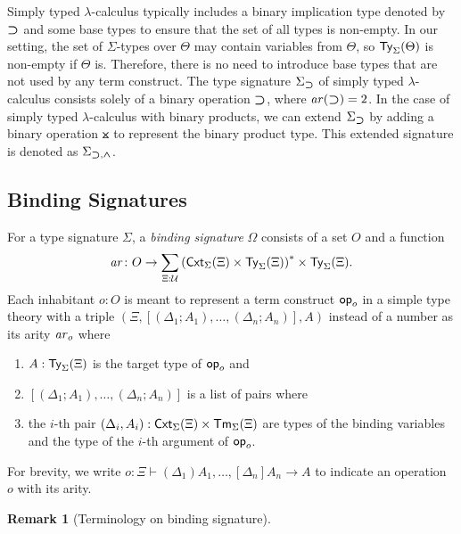 \documentclass[acmsmall,screen]{acmart}
\theoremstyle{acmdefinition}
\newtheorem{remark}[theorem]{Remark}}
\begin{document}
\begin{example}\label{ex:implication}
  Simply typed $\lambda$-calculus typically includes a binary implication type denoted by $\mathbin{\bm{\supset}}$ and some base types to ensure that the set of all types is non-empty.
  In our setting, the set of $\Sigma$-types over $\Theta$ may contain variables from $\Theta$, so $\mathsf{Ty}_{\Sigma}(\Theta)$ is non-empty if $\Theta$ is.
  Therefore, there is no need to introduce base types that are not used by any term construct.
  The type signature $\Sigma_{\mathbin{\bm{\supset}}}$ of simply typed $\lambda$-calculus consists solely of a binary operation $\mathbin{\bm{\supset}}$, where $\mathit{ar}(\mathbin{\bm{\supset}}) = 2$.
  In the case of simply typed $\lambda$-calculus with binary products, we can extend $\Sigma_{\mathbin{\bm{\supset}}}$ by adding a binary operation $\btimes$ to represent the binary product type.
  This extended signature is denoted as $\Sigma_{\mathbin{\bm{\supset}}, \mathbin{\bm{\wedge}}}$.
\end{example}


\subsection{Binding Signatures}
\begin{definition}\label{def:binding-signature}
  For a type signature $\Sigma$, a \emph{binding signature} $\Omega$ consists of a set $O$ and a function
  \[
    \mathit{ar}\colon O \to \sum_{\Xi : \mathcal{U}} \left(\mathsf{Cxt}_\Sigma(\Xi) \times \mathsf{Ty}_\Sigma(\Xi)\right)^* \times \mathsf{Ty}_\Sigma(\Xi).
  \]
  Each inhabitant $o: O$ is meant to represent a term construct $\mathsf{op}_o$ in a simple type theory with a triple $\left(\Xi, \left[\left(\Delta_1; A_1\right), \ldots, \left(\Delta_{n}; A_{n}\right) \right], A\right)$
  instead of a number as its arity $\mathit{ar}_o$ where
  \begin{enumerate}
    \item $A : \mathsf{Ty}_\Sigma(\Xi)$ is the target type of $\mathsf{op}_o$ and
    \item $\left[\left(\Delta_1; A_{1}\right), \ldots, \left(\Delta_{n}; A_{n}\right) \right]$ is a list of pairs where
    \item the $i$-th pair $(\Delta_i, A_i) :\mathsf{Cxt}_{\Sigma}(\Xi) \times \mathsf{Tm}_{\Sigma}(\Xi)$ are types of the binding variables and the type of the $i$-th argument of $\mathsf{op}_{o}$.
  \end{enumerate}
  For brevity, we write $o \colon \Xi \vdash (\Delta_1)A_{1}, \ldots, \left[\Delta_{n}\right] A_{n} \to A$ to indicate an operation $o$ with its arity. 
\end{definition}
\begin{remark}[Terminology on binding signature]
  \cite{Aczel1978,Fiore2010}
\end{remark}
\end{document}

